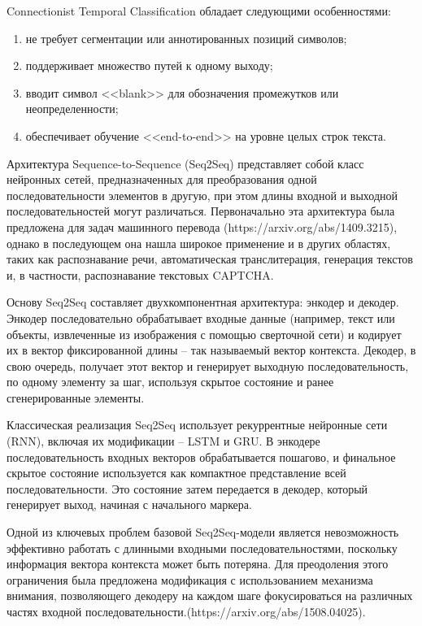 Connectionist Temporal Classification обладает следующими особенностями:

\begin{enumerate}
    \item не требует сегментации или аннотированных позиций символов;
    \item поддерживает множество путей к одному выходу;
    \item вводит символ <<blank>> для обозначения промежутков или 
    неопределенности;
    \item обеспечивает обучение <<end-to-end>> на уровне целых строк текста.
\end{enumerate}

Архитектура Sequence-to-Sequence (Seq2Seq) представляет собой класс нейронных 
сетей, предназначенных для преобразования одной последовательности элементов в 
другую, при этом длины входной и выходной последовательностей могут различаться. 
Первоначально эта архитектура была предложена для задач машинного перевода 
(https://arxiv.org/abs/1409.3215), однако в последующем она нашла широкое применение и в 
других областях, таких как распознавание речи, автоматическая транслитерация, 
генерация текстов и, в частности, распознавание текстовых CAPTCHA.

Основу Seq2Seq составляет двухкомпонентная архитектура: энкодер и декодер. 
Энкодер последовательно обрабатывает входные данные (например, текст или объекты, 
извлеченные из изображения с помощью сверточной сети) и кодирует их в вектор 
фиксированной длины -- так называемый вектор контекста. Декодер, в свою очередь, 
получает этот вектор и генерирует выходную последовательность, по одному элементу 
за шаг, используя скрытое состояние и ранее сгенерированные элементы.

Классическая реализация Seq2Seq использует рекуррентные нейронные сети (RNN), 
включая их модификации -- LSTM и GRU. В энкодере последовательность входных 
векторов обрабатывается пошагово, и финальное скрытое состояние используется как 
компактное представление всей последовательности. Это состояние затем передается 
в декодер, который генерирует выход, начиная с начального маркера.

Одной из ключевых проблем базовой Seq2Seq-модели является невозможность 
эффективно работать с длинными входными последовательностями, поскольку 
информация вектора контекста может быть потеряна. Для преодоления этого 
ограничения была предложена модификация с использованием механизма внимания, 
позволяющего декодеру на каждом шаге фокусироваться на различных частях входной 
последовательности.(https://arxiv.org/abs/1508.04025).

